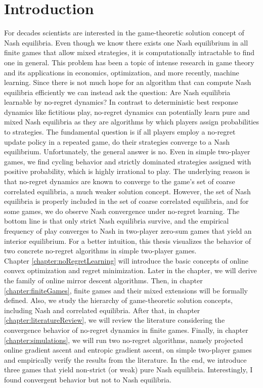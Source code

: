 
\chapter{Introduction}\label{chapter:introduction}

For decades scientists are interested in the game-theoretic solution concept of Nash equilibria. Even though we know there exists one Nash equilibrium in all finite games that allow mixed strategies, it is computationally intractable to find one in general. This problem has been a topic of intense research in game theory and its applications in economics, optimization, and more recently, machine learning. Since there is not much hope for an algorithm that can compute Nash equilibria efficiently we can instead ask the question: Are Nash equilibria learnable by no-regret dynamics? In contrast to deterministic best response dynamics like fictitious play, no-regret dynamics can potentially learn pure and mixed Nash equilibria as they are algorithms by which players assign probabilities to strategies. The fundamental question is if all players employ a no-regret update policy in a repeated game, do their strategies converge to a Nash equilibrium. Unfortunately, the general answer is no. Even in simple two-player games, we find cycling behavior and strictly dominated strategies assigned with positive probability, which is highly irrational to play. The underlying reason is that no-regret dynamics are known to converge to the game's set of coarse correlated equilibria, a much weaker solution concept. However, the set of Nash equilibria is properly included in the set of coarse correlated equilibria, and for some games, we do observe Nash convergence under no-regret learning. The bottom line is that only strict Nash equilibria survive, and the empirical frequency of play converges to Nash in two-player zero-sum games that yield an interior equilibrium. For a better intuition, this thesis visualizes the behavior of two concrete no-regret algorithms in simple two-player games. \\ 

Chapter \ref{chapter:noRegretLearning} will introduce the basic concepts of online convex optimization and regret minimization. Later in the chapter, we will derive the family of online mirror descent algorithms. Then, in chapter \ref{chapter:finiteGames}, finite games and their mixed extensions will be formally defined. Also, we study the hierarchy of game-theoretic solution concepts, including Nash and correlated equilibria. After that, in chapter \ref{chapter:literatureReview}, we will review the literature considering the convergence behavior of no-regret dynamics in finite games. Finally, in chapter \ref{chapter:simulations}, we will run two no-regret algorithms, namely projected online gradient ascent and entropic gradient ascent, on simple two-player games and empirically verify the results from the literature. In the end, we introduce three games that yield non-strict (or weak) pure Nash equilibria. Interestingly, I found convergent behavior but not to Nash equilibria.


